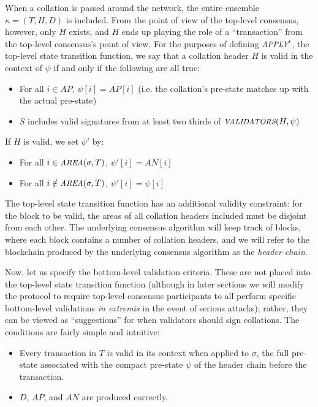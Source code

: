 \documentclass[11pt,a4paper]{article}
\makeatletter
\theoremstyle{plain}
\theoremstyle{definition}
\theoremstyle{remark}
\newcommand{\ie}{i.e.\@\xspace}
\newcommand{\makeintoafunction}[1]{\textit{\uppercase{\small #1}}}
\newcommand{\APPLY}{\makeintoafunction{apply}}
\newcommand{\AREA}{\makeintoafunction{area}}
\newcommand{\VALIDATORS}{\makeintoafunction{validators}}
\makeatother
\begin{document}
When a collation is passed around the network, the entire ensemble $\kappa = (T, H, D)$ is included. From the point of view of the top-level consensus, however, only $H$ exists, and $H$ ends up playing the role of a ``transaction'' from the top-level consensus's point of view. For the purposes of defining $\APPLY'$, the top-level state transition function, we say that a collation header $H$ is valid in the context of $\psi$ if and only if the following are all true:

\begin{itemize}
\item
For all $i \in AP$, $\psi[i] = AP[i]$ (\ie the collation's pre-state matches up with the actual pre-state)
\item
$S$ includes valid signatures from at least two thirds of $\VALIDATORS(H, \psi)$
\end{itemize}

If $H$ is valid, we set $\psi'$ by:

\begin{itemize}
\item
For all $i \in \AREA(\sigma, T)$, $\psi'[i] = AN[i]$
\item
For all $i \notin \AREA(\sigma, T)$, $\psi'[i] = \psi[i]$
\end{itemize}

The top-level state transition function has an additional validity constraint: for the block to be valid, the areas of all collation headers included must be disjoint from each other. The underlying consensus algorithm will keep track of blocks, where each block contains a number of collation headers, and we will refer to the blockchain produced by the underlying consensus algorithm as the \emph{header chain}.

Now, let us specify the bottom-level validation criteria. These are not placed into the top-level state transition function (although in later sections we will modify the protocol to require top-level consensus participants to all perform specific bottom-level validations \emph{in extremis} in the event of serious attacks); rather, they can be viewed as ``suggestions'' for when validators should sign collations. The conditions are fairly simple and intuitive:

\begin{itemize}
\item
Every transaction in $T$ is valid in its context when applied to $\sigma$, the full pre-state associated with the compact pre-state $\psi$ of the header chain before the transaction.
\item
$D$, $AP$, and $AN$ are produced correctly.
\end{itemize}
\end{document}
